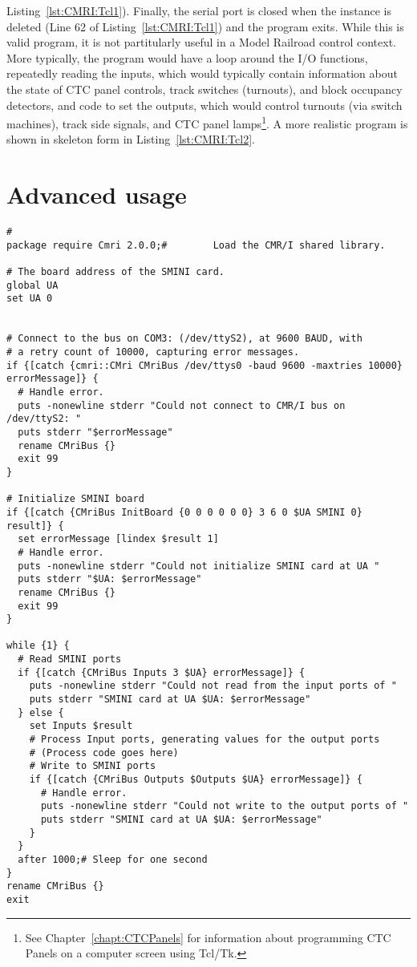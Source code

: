 Listing~\ref{lst:CMRI:Tcl1}). Finally, the serial port is closed when
the instance is deleted (Line 62 of Listing~\ref{lst:CMRI:Tcl1}) and
the program exits. While this is valid program, it is not partitularly
useful in a Model Railroad control context.  More typically, the
program would have a loop around the I/O functions, repeatedly reading
the inputs, which would typically contain information about the state
of CTC panel controls, track switches (turnouts), and block occupancy
detectors, and code to set the outputs, which would control turnouts
(via switch machines), track side signals, and CTC panel
lamps\footnote{See Chapter~\ref{chapt:CTCPanels} for information about
programming CTC Panels on a computer screen using Tcl/Tk.}.  A more
realistic program is shown in skeleton form in
Listing~\ref{lst:CMRI:Tcl2}.

\section{Advanced usage}
\begin{lstlisting}[caption={Using the CMR/I from Tcl, more realistic version},
		   label=lst:CMRI:Tcl2]
#
package require Cmri 2.0.0;#		Load the CMR/I shared library.

# The board address of the SMINI card.
global UA
set UA 0


# Connect to the bus on COM3: (/dev/ttyS2), at 9600 BAUD, with
# a retry count of 10000, capturing error messages.
if {[catch {cmri::CMri CMriBus /dev/ttys0 -baud 9600 -maxtries 10000} errorMessage]} {
  # Handle error.
  puts -nonewline stderr "Could not connect to CMR/I bus on /dev/ttyS2: "
  puts stderr "$errorMessage"
  rename CMriBus {}
  exit 99
}

# Initialize SMINI board
if {[catch {CMriBus InitBoard {0 0 0 0 0 0} 3 6 0 $UA SMINI 0} result]} {
  set errorMessage [lindex $result 1]
  # Handle error.
  puts -nonewline stderr "Could not initialize SMINI card at UA "
  puts stderr "$UA: $errorMessage"
  rename CMriBus {}
  exit 99
}

while {1} {
  # Read SMINI ports
  if {[catch {CMriBus Inputs 3 $UA} errorMessage]} {
    puts -nonewline stderr "Could not read from the input ports of "
    puts stderr "SMINI card at UA $UA: $errorMessage"
  } else {
    set Inputs $result
    # Process Input ports, generating values for the output ports
    # (Process code goes here)
    # Write to SMINI ports
    if {[catch {CMriBus Outputs $Outputs $UA} errorMessage]} {
      # Handle error.
      puts -nonewline stderr "Could not write to the output ports of "
      puts stderr "SMINI card at UA $UA: $errorMessage"
    }
  }
  after 1000;# Sleep for one second
}
rename CMriBus {} 
exit 
\end{lstlisting} 


